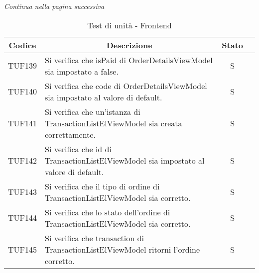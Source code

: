 \begin{center}
  \textit{\small Continua nella pagina successiva}
\end{center}
\begin{table}[H]
  \centering
  \renewcommand{\arraystretch}{1.8}
  \begin{tabular}{c|p{8cm}|c|c}
    \rowcolor[HTML]{125E28}
    \color[HTML]{FFFFFF}\textbf{Codice}
          & \multicolumn{1}{c}{\color[HTML]{FFFFFF}\textbf{Descrizione}}
          & \color[HTML]{FFFFFF}\textbf{Stato}                                                                                                          \\
    \hline
    TUF139 & Si verifica che isPaid di OrderDetailsViewModel sia impostato a false. & S \\
    TUF140 & Si verifica che code di OrderDetailsViewModel sia impostato al valore di default. & S \\
    TUF141 & Si verifica che un'istanza di TransactionListElViewModel sia creata correttamente. & S \\
    TUF142 & Si verifica che id di TransactionListElViewModel sia impostato al valore di default. & S \\
    TUF143 & Si verifica che il tipo di ordine di TransactionListElViewModel sia corretto. & S \\
    TUF144 & Si verifica che lo stato dell'ordine di TransactionListElViewModel sia corretto. & S \\
    TUF145 & Si verifica che transaction di TransactionListElViewModel ritorni l'ordine corretto. & S \\
  \end{tabular}
  \caption{Test di unità - Frontend}
\end{table}

